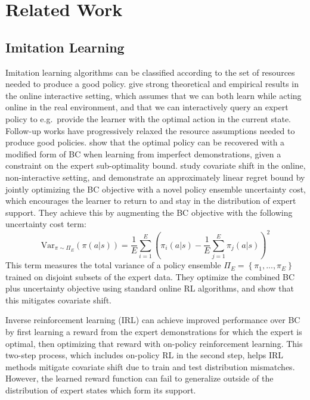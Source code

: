 \documentclass[10pt]{article} %
\theoremstyle{plain}
\theoremstyle{definition}
\theoremstyle{remark}
\begin{document}
\section{Related Work}\label{related}
\subsection{Imitation Learning}
Imitation learning algorithms can be classified according to the set of resources needed to produce a good policy. \citet{Bagnell2} give strong theoretical and empirical results in the online interactive setting, which assumes that we can both learn while acting online in the real environment, and that we can interactively query an expert policy to e.g.~provide the learner with the optimal action in the current state. Follow-up works have progressively relaxed the resource assumptions needed to produce good policies. \citet{noisybc} show that the optimal policy can be recovered with a modified form of BC when learning from imperfect demonstrations, given a constraint on the expert sub-optimality bound. \citet{DRIL} study covariate shift in the online, non-interactive setting, and demonstrate an approximately linear regret bound by jointly optimizing the BC objective with a novel policy ensemble uncertainty cost, which encourages the learner to return to and stay in the distribution of expert support. They achieve this by augmenting the BC objective with the following uncertainty cost term:
\begin{equation}
    \text{Var}_{\pi \sim \Pi_E}\left( \pi(a|s)\right) = \frac{1}{E} \sum_{i=1}^E
    (\pi_i(a|s) - \frac{1}{E} \sum_{j=1}^E \pi_j(a|s)
    )^2
\end{equation}
This term measures the total variance of a policy ensemble $\Pi_E = \left\{ \pi_1, ..., \pi_E\right\}$ trained on disjoint subsets of the expert data. They optimize the combined BC plus uncertainty objective using standard online RL algorithms, and show that this mitigates covariate shift.

Inverse reinforcement learning (IRL) can achieve improved performance over BC by first learning a reward from the expert demonstrations for which the expert is optimal, then optimizing that reward with on-policy reinforcement learning. This two-step process, which includes on-policy RL in the second step, helps IRL methods mitigate covariate shift due to train and test distribution mismatches. However, the learned reward function can fail to generalize outside of the distribution of expert states which form its support. 
\end{document}
